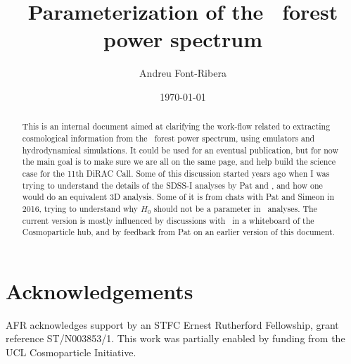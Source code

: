 \documentclass[preprintnumbers,prd,superscriptaddress,notitlepage,nofootinbib] {revtex4-1}
\begin{document}
\title{Parameterization of the \lya\ forest power spectrum}

\author{Andreu Font-Ribera} %

\date{\today}

\begin{abstract}
This is an internal document aimed at clarifying the work-flow related to extracting cosmological information 
from the \lya\ forest power spectrum, using emulators and hydrodynamical simulations.
It could be used for an eventual publication, but for now the main goal is to make sure we are all on the
same page, and help build the science case for the 11th DiRAC Call.
Some of this discussion started years ago when I was trying to understand the details of the SDSS-I analyses
by Pat and \uros, and how one would do an equivalent 3D analysis. 
Some of it is from chats with Pat and Simeon in 2016, trying to understand why $H_0$ should not be a
parameter in \lya\ analyses. 
The current version is mostly influenced by discussions with \anze\ in a whiteboard of the Cosmoparticle hub,
and by feedback from Pat on an earlier version of this document.
\end{abstract}

\maketitle













\section*{Acknowledgements}
AFR acknowledges support by an STFC Ernest Rutherford Fellowship, grant reference ST/N003853/1.
This work was partially enabled by funding from the UCL Cosmoparticle
Initiative.




\appendix

\newpage

\end{document}
